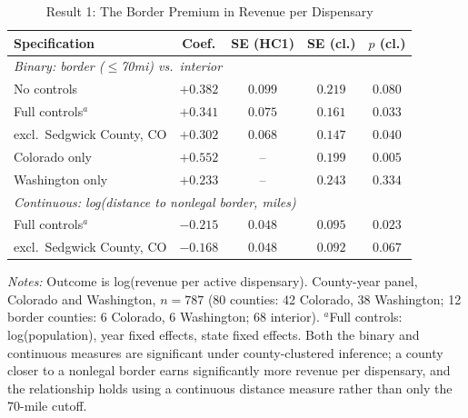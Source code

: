 \begin{table}[htbp]
\centering
\caption{Result 1: The Border Premium in Revenue per Dispensary}
\label{tab:result1}
\small
\begin{tabular}{p{6.6cm}cccc}
\toprule
Specification & Coef. & SE (HC1) & SE (cl.) & $p$ (cl.) \\
\midrule
\multicolumn{5}{l}{\textit{Binary: border ($\le$70mi) vs.\ interior}} \\
No controls & $+0.382$ & $0.099$ & $0.219$ & $0.080$ \\
Full controls$^{a}$ & $+0.341$ & $0.075$ & $0.161$ & $0.033$ \\
\quad excl.\ Sedgwick County, CO & $+0.302$ & $0.068$ & $0.147$ & $0.040$ \\
Colorado only & $+0.552$ & -- & $0.199$ & $0.005$ \\
Washington only & $+0.233$ & -- & $0.243$ & $0.334$ \\
\midrule
\multicolumn{5}{l}{\textit{Continuous: log(distance to nonlegal border, miles)}} \\
Full controls$^{a}$ & $-0.215$ & $0.048$ & $0.095$ & $0.023$ \\
\quad excl.\ Sedgwick County, CO & $-0.168$ & $0.048$ & $0.092$ & $0.067$ \\
\bottomrule
\end{tabular}
\begin{minipage}{0.95\textwidth}
\vspace{0.3em}
\footnotesize
\textit{Notes:} Outcome is log(revenue per active dispensary). County-year panel, Colorado and Washington,
$n=787$ (80 counties: 42 Colorado, 38 Washington; 12 border counties: 6 Colorado, 6 Washington; 68 interior).
$^{a}$Full controls: log(population), year fixed effects, state fixed effects. Both the binary and
continuous measures are significant under county-clustered inference; a county closer to a nonlegal border
earns significantly more revenue per dispensary, and the relationship holds using a continuous distance
measure rather than only the 70-mile cutoff.
\end{minipage}
\end{table}
